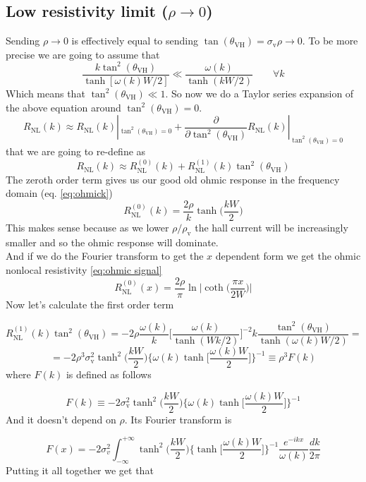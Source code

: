 \subsection{Low resistivity limit ($\rho\to 0$)}
\label{sec:lowrho}
Sending $\rho\to 0$ is effectively equal to sending $\tan(\theta_{\textrm{VH}})=\sigma_{\textrm{v}}\rho\to 0$. To be more precise we are going to assume that
\[
    \frac{k\tan^2(\theta_{\textrm{VH}})}{\tanh[\omega(k)W/2]}\ll \frac{\omega(k)}{\tanh(kW/2)}\quad\quad \forall k  
\]
Which means that $\tan^2(\theta_{\textrm{VH}})\ll 1$. So now we do a Taylor series expansion of the above equation around $\tan^2(\theta_{\textrm{VH}})= 0$.
\[
    R_{\textrm{NL}}(k)\approx R_{\textrm{NL}}(k)|_{\tan^2(\theta_{\textrm{VH}})=0} +
    \frac \partial {\partial \tan^2(\theta_{\textrm{VH}})} R_{\textrm{NL}}(k)|_{\tan^2(\theta_{\textrm{VH}})=0}
\]
that we are going to re-define as
\[
    R_{\textrm{NL}}(k)\approx R_{\textrm{NL}}^{(0)}(k) + R_{\textrm{NL}}^{(1)}(k)\tan^2(\theta_{\textrm{VH}})
\]
The zeroth order term gives us our good old ohmic response in the frequency domain (eq. \ref{eq:ohmick})
\[
    R_{\textrm{NL}}^{(0)}(k)=\frac{2\rho}k\tanh\bigg(\frac{kW}2\bigg)
\]
This makes sense because as we lower $\rho/\rho_{\textrm{v}}$ the hall current will be increasingly smaller and so the ohmic response will dominate.\\
And if we do the Fourier transform to get the $x$ dependent form we get the ohmic nonlocal resistivity \ref{eq:ohmic signal}
\begin{equation}
    R_{\textrm{NL}}^{(0)}(x)=\frac{2\rho}\pi\ln\bigg |\coth \Big(\frac{\pi x}{2W}\Big)\bigg |
\end{equation}
Now let's calculate the first order term

\[
    R_{\textrm{NL}}^{(1)}(k)\tan^2(\theta_{\textrm{VH}})=-2\rho\frac{\omega(k)}k\bigg[\frac{\omega(k)}{\tanh(Wk/2)} \bigg]^{-2}k\frac{\tan^2(\theta_{\textrm{VH}})}{\tanh(\omega(k)W/2)}=
\]
\[
    =-2\rho^3\sigma_{\textrm{v}}^2 \tanh^2\bigg(\frac{kW}2\bigg)\bigg\{\omega(k)\tanh\bigg[\frac{\omega(k) W}2\bigg]\bigg\}^{-1}\equiv
    \rho^3F(k)
\]
where $F(k)$ is defined as follows

\begin{equation}
    F(k)\equiv -2\sigma_{\textrm{v}}^2\tanh^2\bigg(\frac{kW}2\bigg)\bigg\{\omega(k)\tanh\bigg[\frac{\omega(k) W}2\bigg]\bigg\}^{-1}
\end{equation}
And it doesn't depend on $\rho$. Its Fourier transform is 

\begin{equation}
    F(x)=-2\sigma_{v}^2\int_{-\infty}^{+\infty}\tanh^2\bigg(\frac{kW}2\bigg)\bigg\{\tanh\bigg[\frac{\omega(k) W}2\bigg]\bigg\}^{-1}\frac{e^{-ikx}}{\omega(k)}\frac{dk}{2\pi}
\end{equation}
Putting it all together we get that

